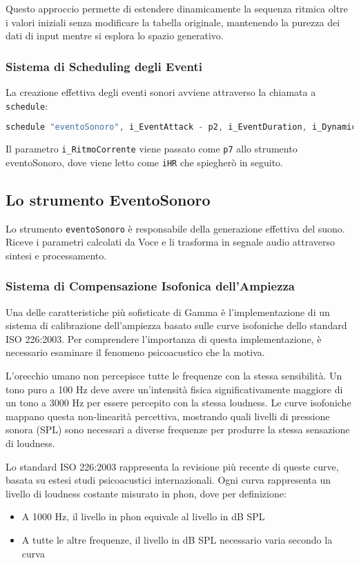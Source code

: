 Questo approccio permette di estendere dinamicamente la sequenza ritmica oltre i valori iniziali senza modificare la tabella originale, mantenendo la purezza dei dati di input mentre si esplora lo spazio generativo.
\subsubsection{Sistema di Scheduling degli Eventi}
La creazione effettiva degli eventi sonori avviene attraverso la chiamata a \texttt{schedule}:

\begin{lstlisting}[language=C]
schedule "eventoSonoro", i_EventAttack - p2, i_EventDuration, i_DynamicIndex, i_Freq1, i_Pos, i_RitmoCorrente, i_Freq2, i_ifnAttacco, gi_Index, i_IdComp, i_SensoMovimento, i_ifn_section_env, i_section_start_time, i_section_duration
\end{lstlisting}

Il parametro \texttt{i\_RitmoCorrente} viene passato come \texttt{p7} allo strumento eventoSonoro, dove viene letto come \texttt{iHR} che spiegherò in seguito.
\subsection{Lo strumento EventoSonoro}
Lo strumento \texttt{eventoSonoro} è responsabile della generazione effettiva del suono. Riceve i parametri calcolati da Voce e li trasforma in segnale audio attraverso sintesi e processamento.
\subsubsection{Sistema di Compensazione Isofonica dell'Ampiezza}
Una delle caratteristiche più sofisticate di Gamma è l'implementazione di un sistema di calibrazione dell'ampiezza basato sulle curve isofoniche dello standard ISO 226:2003\cite{ISO2262003}. Per comprendere l'importanza di questa implementazione, è necessario esaminare il fenomeno psicoacustico che la motiva.

L'orecchio umano non percepisce tutte le frequenze con la stessa sensibilità. Un tono puro a 100 Hz deve avere un'intensità fisica significativamente maggiore di un tono a 3000 Hz per essere percepito con la stessa loudness. Le curve isofoniche mappano questa non-linearità percettiva, mostrando quali livelli di pressione sonora (SPL) sono necessari a diverse frequenze per produrre la stessa sensazione di loudness.

Lo standard ISO 226:2003 rappresenta la revisione più recente di queste curve, basata su estesi studi psicoacustici internazionali. Ogni curva rappresenta un livello di loudness costante misurato in phon, dove per definizione:
\begin{itemize}
 \item A 1000 Hz, il livello in phon equivale al livello in dB SPL
 \item A tutte le altre frequenze, il livello in dB SPL necessario varia secondo la curva
\end{itemize}

